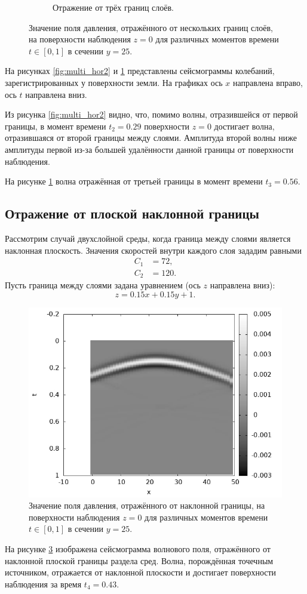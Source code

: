 \documentclass[a4paper, fontsize=14pt]{article}
\begin{document}
\begin{figure}[H]
\begin{subfigure}{.5\textwidth}
		\caption{Отражение от трёх границ слоёв.}
		\label{fig:multi_hor3}
	\end{subfigure}
	\caption{Значение поля давления, отражённого от нескольких границ слоёв, на поверхности наблюдения $z = 0$ для различных моментов времени $t\in [0,1]$ в сечении $y=25$.}
	\label{fig:multi_hor}
\end{figure}

	На рисунках \ref{fig:multi_hor2} и \ref{fig:multi_hor3} представлены сейсмограммы колебаний, зарегистрированных у поверхности земли. На графиках ось $x$ направлена вправо, ось $t$ направлена  вниз. 
	
	Из рисунка \ref{fig:multi_hor2} видно, что, помимо волны, отразившейся от первой границы, в момент времени $t_2 = 0.29$ поверхности $z=0$  достигает волна, отразившаяся от второй границы между слоями. Амплитуда второй волны ниже амплитуды первой из-за большей удалённости данной границы от поверхности наблюдения. 
	
	На рисунке \ref{fig:multi_hor3} волна отражённая от третьей границы в момент времени $t_3 = 0.56$.
	
	\subsection{Отражение от плоской наклонной границы}
		
Рассмотрим случай двухслойной среды, когда граница между слоями является наклонная плоскость. Значения скоростей внутри каждого слоя зададим равными 
\begin{align*}
	C_1 &= 72, \\
	C_2 &= 120.
\end{align*}
	Пусть граница между слоями задана уравнением (ось $z$ направлена вниз):
	\begin{equation}
		z = 0.15 x + 0.15 y + 1.
	\end{equation}
	\begin{figure}[H]
		\centering
		\includegraphics[width=.7\textwidth]{tilted15.png}
		\caption{Значение поля давления, отражённого от наклонной границы, на поверхности наблюдения $z = 0$ для различных моментов времени $t\in [0,1]$ в сечении $y=25$.}
		\label{fig:tilt}
	\end{figure}
	На рисунке \ref{fig:tilt} изображена сейсмограмма волнового поля, отражённого от наклонной плоской границы раздела сред. Волна, порождённая точечным источником, отражается от наклонной плоскости и достигает поверхности наблюдения за время $t_4 = 0.43$. %
	
\end{document}
